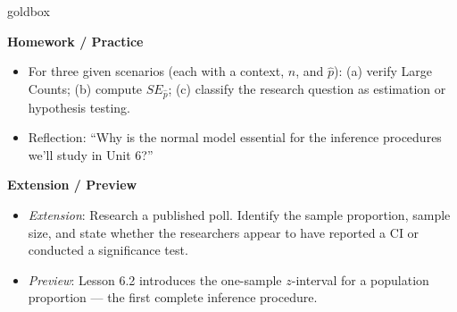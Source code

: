\documentclass[10pt]{article}
\begin{document}
\begin{skillbox}{goldbox}
\begin{minipage}[t]{0.48\linewidth}
    \textbf{Homework / Practice}
    \begin{itemize}
        \item For three given scenarios (each with a context, $n$, and $\hat p$):
              (a) verify Large Counts; (b) compute $SE_{\hat p}$; (c) classify the
              research question as estimation or hypothesis testing.
        \item Reflection: ``Why is the normal model essential for the inference
              procedures we'll study in Unit 6?''
    \end{itemize}
\end{minipage}
\hfill
\begin{minipage}[t]{0.48\linewidth}
    \textbf{Extension / Preview}
    \begin{itemize}
        \item \textit{Extension}: Research a published poll. Identify the sample proportion,
              sample size, and state whether the researchers appear to have reported a CI
              or conducted a significance test.
        \item \textit{Preview}: Lesson 6.2 introduces the one-sample $z$-interval for
              a population proportion --- the first complete inference procedure.
    \end{itemize}
\end{minipage}
\end{skillbox}
\end{document}

